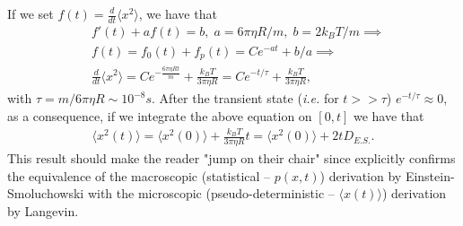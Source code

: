 If we set $f(t)=\frac{d}{dt}\langle x^2\rangle$, we have that 
\begin{align*}
	&f'(t)+af(t)=b, \;a=6\pi\eta R/m, \;b=2k_BT/m\implies\\
	&f(t)=f_0(t)+f_p(t)=Ce^{-at}+b/a\implies\\
	&\frac{d}{dt}\langle x^2\rangle =Ce^{-\frac{6\pi\eta R t}{m}}+\frac{k_BT}{3\pi\eta R}=Ce^{-t/\tau}+\frac{k_BT}{3\pi\eta R},
\end{align*}
with $\tau=m/6\pi\eta R\sim 10^{-8}s$. After the transient state (\textit{i.e.} for $t>>\tau$) $e^{-t/\tau}\approx 0$, as a consequence, if we integrate the above equation on $[0,t]$ we have that
\begin{align*}
	\langle x^2(t)\rangle =\langle x^2(0)\rangle +\frac{k_BT}{3\pi\eta R}t=\langle x^2(0)\rangle +2t D_{E.S.}.
\end{align*}
This result should make the reader "jump on their chair" since explicitly confirms the equivalence of the macroscopic (statistical -- $p(x,t)$) derivation by Einstein-Smoluchowski with the microscopic (pseudo-deterministic -- $\langle x(t)\rangle$) derivation by Langevin. 






















